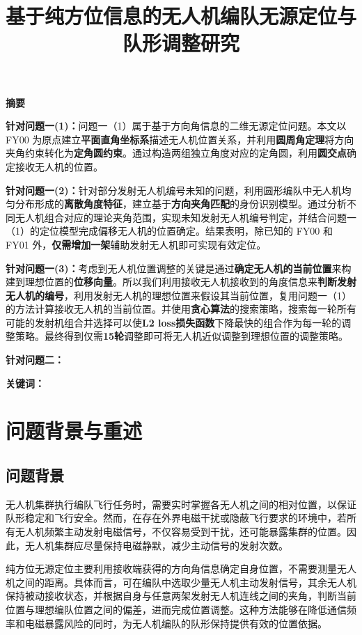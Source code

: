 \documentclass[UTF-8,a4paper,zihao=-4]{ctexart}
\makeatletter
\renewcommand{\maketitle}{
    \begin{center}
        \vspace*{-2cm}
        {\zihao{2}\heiti\@title\par}
    \end{center}
}
\renewenvironment{abstract}
{
    \begin{center}
        {\zihao{-3}\textbf{摘要}}
    \end{center}
    \zihao{-4}
}
{}
\makeatother
\begin{document}
\title{基于纯方位信息的无人机编队无源定位与队形调整研究}
\date{}
\maketitle

\begin{abstract}

    \textbf{针对问题一(1)：}问题一（1）属于基于方向角信息的二维无源定位问题。本文以 FY00 为原点建立\textbf{平面直角坐标系}描述无人机位置关系，并利用\textbf{圆周角定理}将方向夹角约束转化为\textbf{定角圆约束}。通过构造两组独立角度对应的定角圆，利用\textbf{圆交点}确定接收无人机的位置。

    \textbf{针对问题一(2)：}针对部分发射无人机编号未知的问题，利用圆形编队中无人机均匀分布形成的\textbf{离散角度特征}，建立基于\textbf{方向夹角匹配}的身份识别模型。通过分析不同无人机组合对应的理论夹角范围，实现未知发射无人机编号判定，并结合问题一（1）的定位模型完成偏移无人机的位置确定。结果表明，除已知的 FY00 和 FY01 外，\textbf{仅需增加一架}辅助发射无人机即可实现有效定位。

    \textbf{针对问题一(3)：}考虑到无人机位置调整的关键是通过\textbf{确定无人机的当前位置}来构建到理想位置的\textbf{位移向量}。所以我们利用接收无人机接收到的角度信息来\textbf{判断发射无人机的编号}，利用发射无人机的理想位置来假设其当前位置，复用问题一（1）的方法计算接收无人机的当前位置。并使用\textbf{贪心算法}的搜索策略，搜索每一轮所有可能的发射机组合并选择可以使\textbf{L2 loss损失函数}下降最快的组合作为每一轮的调整策略。最终得到仅需\textbf{15轮}调整即可将无人机近似调整到理想位置的调整策略。

    \textbf{针对问题二：}

\noindent \textbf{关键词：} 
\end{abstract}

\newpage
\section{问题背景与重述}
\subsection{问题背景}

无人机集群执行编队飞行任务时，需要实时掌握各无人机之间的相对位置，以保证队形稳定和飞行安全。然而，在存在外界电磁干扰或隐蔽飞行要求的环境中，若所有无人机频繁主动发射电磁信号，不仅容易受到干扰，还可能暴露集群的位置。因此，无人机集群应尽量保持电磁静默，减少主动信号的发射次数。

纯方位无源定位主要利用接收端获得的方向角信息确定自身位置，不需要测量无人机之间的距离。具体而言，可在编队中选取少量无人机主动发射信号，其余无人机保持被动接收状态，并根据自身与任意两架发射无人机连线之间的夹角，判断当前位置与理想编队位置之间的偏差，进而完成位置调整。这种方法能够在降低通信频率和电磁暴露风险的同时，为无人机编队的队形保持提供有效的位置依据。
\end{document}
